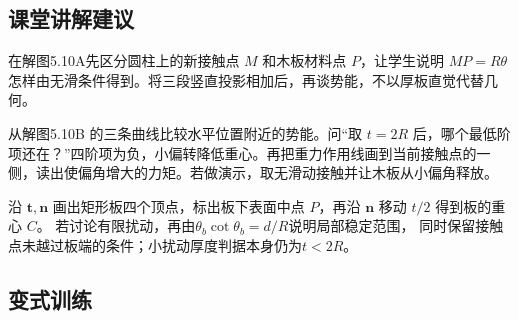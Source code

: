 \documentclass[UTF8,fontset=fandol,a4paper,11pt]{ctexart}
\newcommand{\vect}[1]{\bm{#1}}
\begin{document}


\subsection*{课堂讲解建议}

在解图5.10A先区分圆柱上的新接触点 $M$ 和木板材料点 $P$，让学生说明 $MP=R\theta$ 怎样由无滑条件得到。将三段竖直投影相加后，再谈势能，不以厚板直觉代替几何。

从解图5.10B 的三条曲线比较水平位置附近的势能。问“取 $t=2R$ 后，哪个最低阶项还在？”四阶项为负，小偏转降低重心。再把重力作用线画到当前接触点的一侧，读出使偏角增大的力矩。若做演示，取无滑动接触并让木板从小偏角释放。

沿 $\vect t,\vect n$ 画出矩形板四个顶点，标出板下表面中点 $P$，再沿 $\vect n$ 移动 $t/2$ 得到板的重心 $C$。
若讨论有限扰动，再由$\theta_b\cot\theta_b=d/R$说明局部稳定范围，
同时保留接触点未越过板端的条件；小扰动厚度判据本身仍为$t<2R$。



\subsection*{变式训练}
\end{document}
